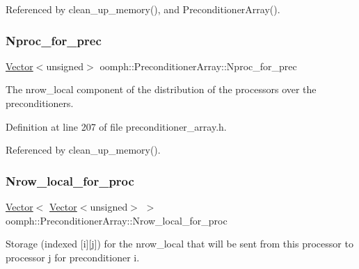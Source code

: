Referenced by clean\+\_\+up\+\_\+memory(), and Preconditioner\+Array().

\mbox{\label{classoomph_1_1PreconditionerArray_accd34d22e7859ca172624b3882127e30}} 
\subsubsection{\texorpdfstring{Nproc\+\_\+for\+\_\+prec}{Nproc\_for\_prec}}
{\footnotesize\ttfamily \hyperlink{classoomph_1_1Vector}{Vector}$<$unsigned$>$ oomph\+::\+Preconditioner\+Array\+::\+Nproc\+\_\+for\+\_\+prec\hspace{0.3cm}{\ttfamily [private]}}



The nrow\+\_\+local component of the distribution of the processors over the preconditioners. 



Definition at line 207 of file preconditioner\+\_\+array.\+h.



Referenced by clean\+\_\+up\+\_\+memory().

\mbox{\label{classoomph_1_1PreconditionerArray_a513f1f2a2ded6e0b377f58c34bf47647}} 
\subsubsection{\texorpdfstring{Nrow\+\_\+local\+\_\+for\+\_\+proc}{Nrow\_local\_for\_proc}}
{\footnotesize\ttfamily \hyperlink{classoomph_1_1Vector}{Vector}$<$ \hyperlink{classoomph_1_1Vector}{Vector}$<$unsigned$>$ $>$ oomph\+::\+Preconditioner\+Array\+::\+Nrow\+\_\+local\+\_\+for\+\_\+proc\hspace{0.3cm}{\ttfamily [private]}}



Storage (indexed \mbox{[}i\mbox{]}\mbox{[}j\mbox{]}) for the nrow\+\_\+local that will be sent from this processor to processor j for preconditioner i. 



